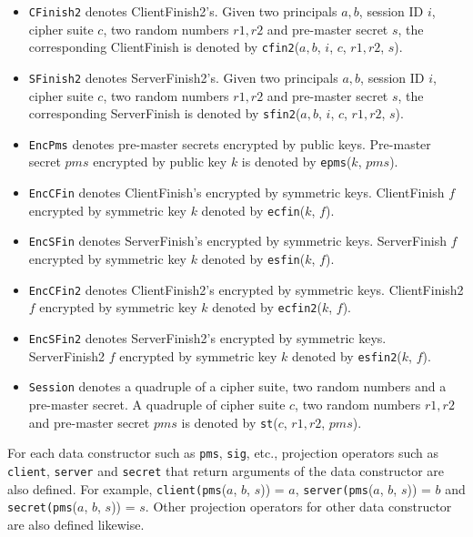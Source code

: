 \documentclass[a4paper,fleqn]{cas-dc}
\begin{document}
\begin{itemize}
\item \verb!CFinish2! denotes ClientFinish2’s. Given two principals $a, b$, session ID $i$, cipher suite $c$, two random numbers $r1, r2$ and pre-master secret $s$, the corresponding ClientFinish is denoted by \verb!cfin2!($a, b$, $i$, $c$, $r1, r2$, $s$).
\item \verb!SFinish2! denotes ServerFinish2’s. Given two principals $a, b$, session ID $i$, cipher suite $c$, two random numbers $r1, r2$ and pre-master secret $s$, the corresponding ServerFinish is denoted by \verb!sfin2!($a, b$, $i$, $c$, $r1, r2$, $s$).
\item \verb!EncPms! denotes pre-master secrets encrypted by public keys. Pre-master secret $pms$ encrypted by public key $k$ is denoted by \verb!epms!($k$, $pms$).
\item \verb!EncCFin! denotes ClientFinish’s encrypted by symmetric keys. ClientFinish $f$ encrypted by symmetric key $k$ denoted by \verb!ecfin!($k$, $f$).
\item \verb!EncSFin! denotes ServerFinish’s encrypted by symmetric keys. ServerFinish $f$ encrypted by symmetric key $k$ denoted by \verb!esfin!($k$, $f$).
\item \verb!EncCFin2! denotes ClientFinish2’s encrypted by symmetric keys. ClientFinish2 $f$ encrypted by symmetric key $k$ denoted by \verb!ecfin2!($k$, $f$).
\item \verb!EncSFin2! denotes ServerFinish2’s encrypted by symmetric keys. ServerFinish2 $f$ encrypted by symmetric key $k$ denoted by \verb!esfin2!($k$, $f$).
\item \verb!Session! denotes a quadruple of a cipher suite, two random numbers and a pre-master secret. A quadruple of cipher suite $c$, two random numbers $r1, r2$ and pre-master secret $pms$ is denoted by \verb!st!($c$, $r1, r2$, $pms$).
\end{itemize}

For each data constructor such as \verb!pms!, \verb!sig!, etc., projection operators such as \verb!client!, \verb!server! and \verb!secret! that return arguments of the data constructor are also defined. For example, \verb!client(pms!($a$, $b$, $s$)) = $a$, \verb!server(pms!($a$, $b$, $s$)) = $b$ and \verb!secret(pms!($a$, $b$, $s$)) = $s$. Other projection operators for other data constructor are also defined likewise.
\end{document}
